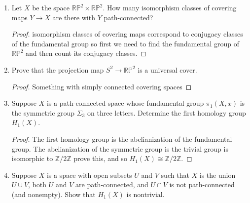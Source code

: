 \documentclass{article}
\begin{document}
\begin{enumerate}
	\begin{proof}
	Let $f: \mathbb{R} \rightarrow S^1$ be the map taking $x \mapsto (\cos x, \sin x)$.
	This is a covering map since 
	{\color{red} explain}.
	This is not a homeomorphism since $\pi_1(\mathbb{R}) = 0 \not \cong \mathbb{Z} \cong \pi_1(\mathbb{R})$ and the fundamental group is a homeomorphism invariant. 
	\end{proof}
	
	\item Let $X$ be the space $\mathbb{RP}^2 \times \mathbb{RP}^2.$ 
	How many isomorphism classes of covering maps $Y \rightarrow X$ are there
	with $Y$ path-connected?
	
	\begin{proof}
	{\color{red} isomorphism classes of covering maps correspond to conjugacy classes of the fundamental group so first we need to find the fundamental group of $\mathbb{RP}^2$ and then count its conjugacy classes.}
	\end{proof}
	
	\item Prove that the projection map $S^2 \rightarrow \mathbb{RP}^2$ is a universal
	cover.
	
	\begin{proof}
	{\color{red} Something with simply connected covering spaces}
	\end{proof}
	
	\item Suppose $X$ is a path-connected space whose fundamental group $\pi_1(X,x)$
	is the symmetric group $\Sigma_3$ on three letters. 
	Determine the first homology group $H_1(X)$.
	
	\begin{proof}
	The first homology group is the abelianization of the fundamental group.
	The abelianization of the symmetric group is the trivial group is isomorphic to
	$\mathbb{Z}/2 \mathbb{Z}$ {\color{red} prove this}, and so $H_1(X) \cong \mathbb{Z}/2\mathbb{Z}$.
	\end{proof}
	
	\item Suppose $X$ is a space with open subsets $U$ and $V$ such that $X$ is the 
	union $U \cup V$, both $U$ and $V$ are path-connected, and $U \cap V$ is not 
	path-connected (and nonempty). Show that $H_1(X)$ is nontrivial.
	
	

\end{enumerate}
\end{document}

